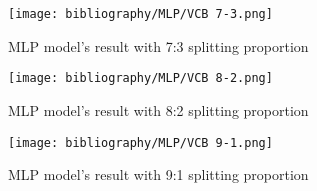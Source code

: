 \documentclass{ieeeojies}
\begin{document}

\begin{figure}[H]
  \centering
  \begin{minipage}{0.8\linewidth}
    \centering
    \texttt{[image: bibliography/MLP/VCB 7-3.png]}
    \caption{MLP model's result with 7:3 splitting proportion}
    \label{fig8}
  \end{minipage}
\end{figure}

\begin{figure}[H]
  \centering
  \begin{minipage}{0.8\linewidth}
    \centering
    \texttt{[image: bibliography/MLP/VCB 8-2.png]}
    \caption{MLP model's result with 8:2 splitting proportion}
    \label{fig8}
  \end{minipage}
\end{figure}

\begin{figure}[H]
  \centering
  \begin{minipage}{0.8\linewidth}
    \centering
    \texttt{[image: bibliography/MLP/VCB 9-1.png]}
    \caption{MLP model's result with 9:1 splitting proportion}
    \label{fig8}
  \end{minipage}
\end{figure}


\end{document}

